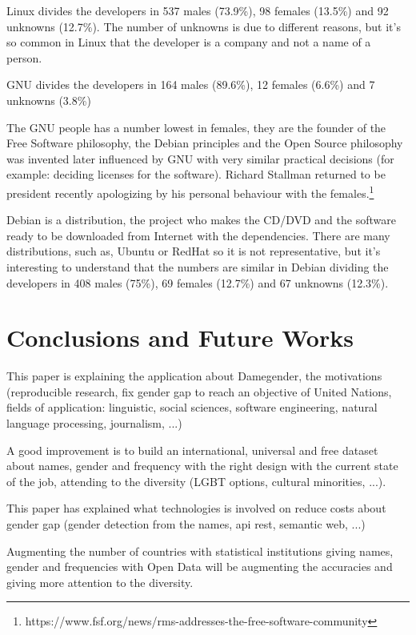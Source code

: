 \documentclass[a4paper]{article}
\begin{document}
Linux divides the developers in 537 males (73.9\%), 98 females
(13.5\%) and 92 unknowns (12.7\%). The number of unknowns is due to
different reasons, but it's so common in Linux that the developer is a
company and not a name of a person.

GNU divides the developers in 164 males (89.6\%), 12 females (6.6\%)
and 7 unknowns (3.8\%)

The GNU people has a number lowest in females, they are the founder of
the Free Software philosophy, the Debian principles and the Open
Source philosophy was invented later influenced by GNU with very
similar practical decisions (for example: deciding licenses for the
software). Richard Stallman returned to be president recently
apologizing by his personal behaviour with the
females.\footnote{https://www.fsf.org/news/rms-addresses-the-free-software-community}

Debian is a distribution, the project who makes the CD/DVD and the
software ready to be downloaded from Internet with the
dependencies. There are many distributions, such as, Ubuntu or RedHat
so it is not representative, but it's interesting to understand that
the numbers are similar in Debian dividing the developers in 408 males
(75\%), 69 females (12.7\%) and 67 unknowns (12.3\%).


\section{Conclusions and Future Works}
\label{sec:conclusions}

This paper is explaining the application about Damegender, the
motivations (reproducible research, fix gender gap to reach an
objective of United Nations, fields of application: linguistic, social
sciences, software engineering, natural language processing,
journalism, ...)

A good improvement is to build an international, universal and free
dataset about names, gender and frequency with the right design with
the current state of the job, attending to the diversity (LGBT
options, cultural minorities, ...).

This paper has explained what technologies is involved on reduce costs
about gender gap (gender detection from the names, api rest, semantic
web, ...)

Augmenting the number of countries with statistical institutions
giving names, gender and frequencies with Open Data will be augmenting
the accuracies and giving more attention to the diversity.
\end{document}
